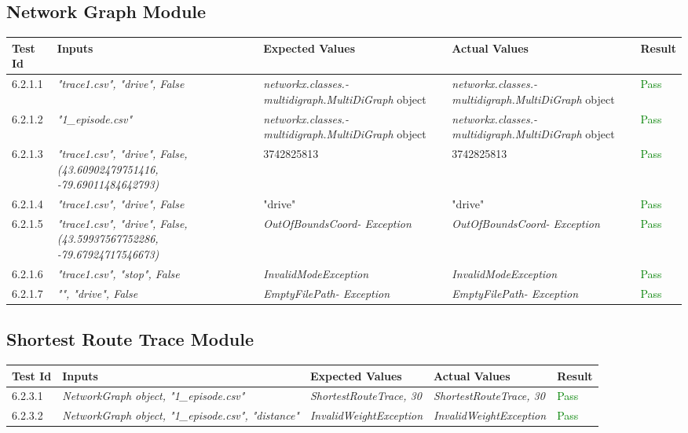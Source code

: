 \documentclass[12pt, titlepage]{article}
\begin{document}
\subsection{Network Graph Module}
\begin{tabular}{ | m{3.5em} | m{4cm}| m{4cm} | m{4cm} | m{1.2cm} | } 
  \hline
  \textbf{Test Id}& \textbf{Inputs} & \textbf{Expected Values} & \textbf{Actual Values} & \textbf{Result} \\ 
  \hline
  6.2.1.1 & \textit{"trace1.csv", "drive", False} & \textit{networkx.classes.- multidigraph.MultiDiGraph} object & \textit{networkx.classes.- multidigraph.MultiDiGraph} object & \textcolor{green}{Pass} \\ 
  \hline
  6.2.1.2 & \textit{"1\_episode.csv"} & \textit{networkx.classes.- multidigraph.MultiDiGraph} object & \textit{networkx.classes.- multidigraph.MultiDiGraph} object & \textcolor{green}{Pass} \\
  \hline
  6.2.1.3 & \textit{"trace1.csv", "drive", False, (43.60902479751416, -79.69011484642793)} & 3742825813 & 3742825813 & \textcolor{green}{Pass} \\
  \hline
  6.2.1.4 & \textit{"trace1.csv", "drive", False} & "drive" & "drive" & \textcolor{green}{Pass} \\
  \hline
  6.2.1.5 & \textit{"trace1.csv", "drive", False, (43.59937567752286, -79.67924717546673)} & \textit{OutOfBoundsCoord- Exception} & \textit{OutOfBoundsCoord- Exception} & \textcolor{green}{Pass} \\
  \hline
  6.2.1.6 & \textit{"trace1.csv", "stop", False} & \textit{InvalidModeException} & \textit{InvalidModeException} & \textcolor{green}{Pass} \\
  \hline
  6.2.1.7 & \textit{"", "drive", False} & \textit{EmptyFilePath- Exception} & \textit{EmptyFilePath- Exception} & \textcolor{green}{Pass} \\
  \hline
\end{tabular}
\subsection{Shortest Route Trace Module}
\begin{tabular}{ | m{3.5em} | m{4cm}| m{4cm} | m{4cm} | m{1.2cm} | } 
  \hline
  \textbf{Test Id}& \textbf{Inputs} & \textbf{Expected Values} & \textbf{Actual Values} & \textbf{Result} \\ 
  \hline
  6.2.3.1 & \textit{NetworkGraph object, "1\_episode.csv"} & \textit{ShortestRouteTrace, 30} & \textit{ShortestRouteTrace, 30} & \textcolor{green}{Pass} \\ 
  \hline
  6.2.3.2 & \textit{NetworkGraph object, "1\_episode.csv", "distance"} & \textit{InvalidWeightException} & \textit{InvalidWeightException} & \textcolor{green}{Pass} \\
  \hline
\end{tabular}
\end{document}
